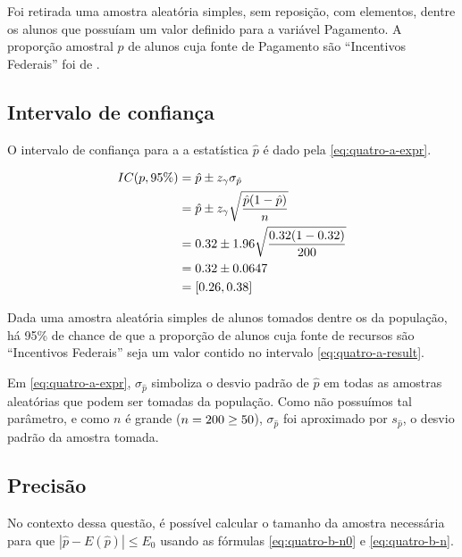 

	Foi retirada uma amostra aleatória simples, sem reposição, com \QUATROn
	elementos, dentre os \QUATRON alunos que possuíam um valor definido para a
	variável Pagamento. A proporção amostral $\hat{p}$ de alunos cuja fonte de
	Pagamento são ``Incentivos Federais'' foi de \QUATROpAmostral.

\subsection{Intervalo de confiança}

	O intervalo de confiança para a a estatística $\hat{p}$ é dado pela
	\autoref{eq:quatro-a-expr}.

	\begin{align} 
		IC(p, 95\%) \label{eq:quatro-a-expr}
					&= \hat{p} \pm z_\gamma \sigma_{\hat{p}} \\
					\label{eq:quatro-a-estim}
					&= \hat{p} \pm z_\gamma \sqrt{\frac{\hat{p}(1-\hat{p})}{n}} \\
					&= 0.32 \pm 1.96 \sqrt{\frac{0.32 (1- 0.32)}{200}} \nonumber \\
					&= 0.32 \pm 0.0647 \nonumber \\
					\label{eq:quatro-a-result}
					&= [0.26, 0.38]
	\end{align}

	Dada uma amostra aleatória simples de \QUATROn alunos tomados dentre os
	\QUATRON da população, há 95\% de chance de que a proporção de alunos
	cuja fonte de recursos são ``Incentivos Federais'' seja um valor contido
	no intervalo \eqref{eq:quatro-a-result}.

	Em \eqref{eq:quatro-a-expr}, $\sigma_{\hat{p}}$ simboliza o desvio
	padrão de $\hat{p}$ em todas as amostras aleatórias que podem ser
	tomadas da população. Como não possuímos tal parâmetro, e como $n$ é
	grande ($n = 200 \geq 50$), $\sigma_{\hat{p}}$ foi aproximado por
	$s_{\hat{p}}$, o desvio padrão da amostra tomada.

\subsection{Precisão}

	No contexto dessa questão, é possível calcular o tamanho da amostra
	necessária para que $|\hat{p} - E(\hat{p})| \leq E_0$ usando as fórmulas
	\eqref{eq:quatro-b-n0} e \eqref{eq:quatro-b-n}.

